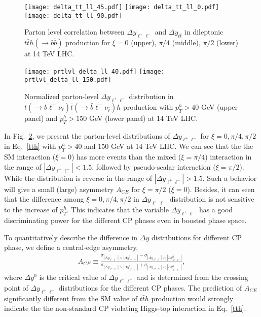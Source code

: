 \documentclass[twocolumn,prd,noshowpacs,nofootinbib,amsmath,amssymb,superscriptaddress,preprintnumbers]{revtex4}
\begin{document}
\begin{figure}[t!]
\texttt{[image: delta\_tt\_ll\_45.pdf]}
\texttt{[image: delta\_tt\_ll\_0.pdf]}
\texttt{[image: delta\_tt\_ll\_90.pdf]}
\caption{Parton level correlation between $\Delta y_{\ell^+\ell^-}$ and $\Delta y_{t\bar{t}}$ in dileptonic $t\bar{t}h(\to b\bar{b})$ production for $\xi=0$ (upper), $\pi/4$ (middle), $\pi/2$ (lower) at 14 TeV LHC.}
\label{fig:correlation}
\end{figure}


\begin{figure}[t]
\centering
\texttt{[image: prtlvl\_delta\_ll\_40.pdf]}
\texttt{[image: prtlvl\_delta\_ll\_150.pdf]}
\caption{Normalized parton-level $\Delta y_{\ell^+\ell^-}$ distribution in $t(\to b\ell^+ \nu_\ell)\bar{t}(\to \bar{b}\ell^-\nu_{\bar{\ell}})h$ production with $p^h_T>40$ GeV (upper panel) and $p^h_T> 150$ GeV (lower panel) at 14 TeV LHC.}
\label{fig:decay_tt_ll_1d}
\end{figure}
In Fig.~\ref{fig:decay_tt_ll_1d}, we present the parton-level distributions of $\Delta y_{\ell^+\ell^-}$ for $\xi=0, \pi/4, \pi/2$ in Eq.~\ref{tth} with $p^h_T>40$ and $150$ GeV at 14 TeV LHC. We can see that the the SM interaction ($\xi=0$) has more events than the mixed ($\xi=\pi/4$) interaction in the range of $|\Delta y_{\ell^+\ell^-}|<1.5$, followed by pseudo-scalar interaction ($\xi=\pi/2$). While the distribution is reverse in the range of $|\Delta y_{\ell^+\ell^-}|>1.5$. Such a behavior will give a small (large) asymmetry $A_{CE}$ for $\xi=\pi/2$ ($\xi=0$). Besides, it can seen that the difference among $\xi=0, \pi/4, \pi/2$ in $\Delta y_{\ell^+\ell^-}$ distribution is not sensitive to the increase of $p^h_T$. This indicates that the variable $\Delta y_{\ell^+\ell^-}$ has a good discriminating power for the different CP phases even in boosted phase space.

To quantitatively describe the difference in $\Delta y$ distributions for different CP phase, we define a central-edge asymmetry,
\begin{eqnarray}
A_{CE} \equiv \frac{\sigma_{|\Delta y_{\ell^+\ell^-}|>|\Delta y^0_{\ell^+\ell^-}|}-\sigma_{|\Delta y_{\ell^+\ell^-}|<|\Delta y^0_{\ell^+\ell^-}|}}{\sigma_{|\Delta y_{\ell^+\ell^-}|>|\Delta y^0_{\ell^+\ell^-}|}+\sigma_{|\Delta y_{\ell^+\ell^-}|<|\Delta y^0_{\ell^+\ell^-}|}},
\end{eqnarray}
where $\Delta y^0$ is the critical value of $\Delta y_{\ell^+\ell^-}$ and is determined from the crossing point of $\Delta y_{\ell^+\ell^-}$ distributions for the different CP phases. The prediction of $A_{CE}$ significantly different from the SM value of $t\bar{t}h$ production would strongly indicate the the non-standard CP violating Higgs-top interaction in Eq.~\ref{tth}.
\end{document}
